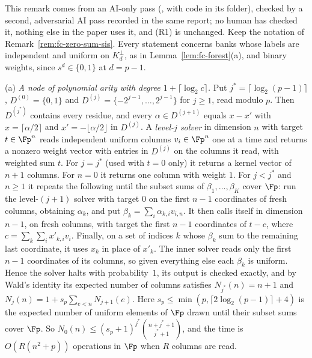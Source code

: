 \begin{remark}
\label{rem:fc-zero-sum-arity}
This remark comes from an AI-only pass (, with code in its folder), checked by a second, adversarial AI pass recorded in the same report; no human has checked it, nothing else in the paper uses it, and (R1) is unchanged. Keep the notation of Remark~\ref{rem:fc-zero-sum-sis}. Every statement concerns banks whose labels are independent and uniform on $K_d^\perp$, as in Lemma~\ref{lem:fc-forest}(a), and binary weights, since $s^d \in \{0,1\}$ at $d = p-1$.

\textup{(a)} \emph{A node of polynomial arity with degree $1+\lceil\log_2c\rceil$.} Put $j^* = \lceil\log_2(p-1)\rceil$, $D^{(0)} = \{0,1\}$ and $D^{(j)} = \{-2^{j-1},\dots,2^{j-1}\}$ for $j \ge 1$, read modulo $p$. Then $D^{(j^*)}$ contains every residue, and every $\alpha \in D^{(j+1)}$ equals $x - x'$ with $x = \lceil\alpha/2\rceil$ and $x' = -\lfloor\alpha/2\rfloor$ in $D^{(j)}$. A \emph{level-$j$ solver} in dimension $n$ with target $t \in \Fp^n$ reads independent uniform columns $v_i \in \Fp^n$ one at a time and returns a nonzero weight vector with entries in $D^{(j)}$ on the columns it read, with weighted sum $t$. For $j = j^*$ (used with $t = 0$ only) it returns a kernel vector of $n+1$ columns. For $n = 0$ it returns one column with weight $1$. For $j < j^*$ and $n \ge 1$ it repeats the following until the subset sums of $\beta_1,\dots,\beta_K$ cover $\Fp$: run the level-$(j+1)$ solver with target $0$ on the first $n-1$ coordinates of fresh columns, obtaining $\alpha_k$, and put $\beta_k = \sum_i\alpha_{k,i}v_{i,n}$. It then calls itself in dimension $n-1$, on fresh columns, with target the first $n-1$ coordinates of $t - c$, where $c = \sum_k\sum_i x'_{k,i}v_i$. Finally, on a set of indices $k$ whose $\beta_k$ sum to the remaining last coordinate, it uses $x_k$ in place of $x'_k$. The inner solver reads only the first $n-1$ coordinates of its columns, so given everything else each $\beta_k$ is uniform. Hence the solver halts with probability~$1$, its output is checked exactly, and by Wald's identity its expected number of columns satisfies $N_{j^*}(n) = n+1$ and $N_j(n) = 1 + s_p\sum_{e<n}N_{j+1}(e)$. Here $s_p \le \min(p,\lceil2\log_2(p-1)\rceil+4)$ is the expected number of uniform elements of $\Fp$ drawn until their subset sums cover $\Fp$. So $N_0(n) \le (s_p+1)^{j^*}\binom{n+j^*+1}{j^*+1}$, and the time is $O(R(n^2+p))$ operations in $\Fp$ when $R$ columns are read.


\end{remark}
